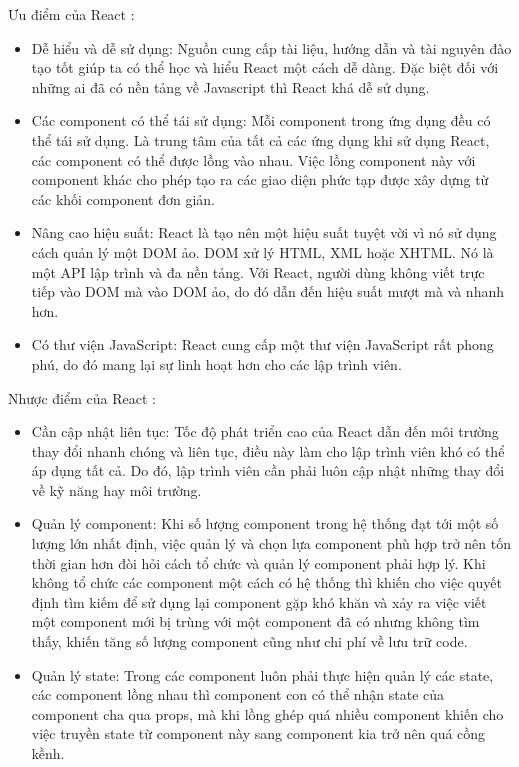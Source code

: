     Ưu điểm của React \cite{technologyReactAdvance}:
    \begin{itemize}
        \item Dễ hiểu và dễ sử dụng: Nguồn cung cấp tài liệu, hướng dẫn và tài nguyên đào tạo tốt giúp ta có thể học và hiểu React một cách dễ dàng. Đặc biệt đối với những ai đã có nền tảng về Javascript thì React khá dễ sử dụng.
        \item Các component có thể tái sử dụng: Mỗi component trong ứng dụng đều có thể tái sử dụng. Là trung tâm của tất cả các ứng dụng khi sử dụng React, các component có thể được lồng vào nhau. Việc lồng component này với component khác cho phép tạo ra các giao diện phức tạp được xây dựng từ các khối component đơn giản.
        \item Nâng cao hiệu suất: React là tạo nên một hiệu suất tuyệt vời vì nó sử dụng cách quản lý một DOM ảo. DOM xử lý HTML, XML hoặc XHTML. Nó là một API lập trình và đa nền tảng. Với React, người dùng không viết trực tiếp vào DOM mà vào DOM ảo, do đó dẫn đến hiệu suất mượt mà và nhanh hơn.
        \item Có thư viện JavaScript: React cung cấp một thư viện JavaScript rất phong phú, do đó mang lại sự linh hoạt hơn cho các lập trình viên.
    \end{itemize}

    Nhược điểm của React \cite{technologyReactAdvance}:
    \begin{itemize}
        \item Cần cập nhật liên tục: Tốc độ phát triển cao của React dẫn đến môi trường thay đổi nhanh chóng và liên tục, điều này làm cho lập trình viên khó có thể áp dụng tất cả. Do đó, lập trình viên cần phải luôn cập nhật những thay đổi về kỹ năng hay môi trường.
        \item Quản lý component: Khi số lượng component trong hệ thống đạt tới một số lượng lớn nhất định, việc quản lý và chọn lựa component phù hợp trở nên tốn thời gian hơn đòi hỏi cách tổ chức và quản lý component phải hợp lý. Khi không tổ chức các component một cách có hệ thống thì khiến cho việc quyết định tìm kiếm để sử dụng lại component gặp khó khăn và xảy ra việc viết một component mới bị trùng với một component đã có nhưng không tìm thấy, khiến tăng số lượng component cũng như chi phí về lưu trữ code.
        \item Quản lý state: Trong các component luôn phải thực hiện quản lý các state, các component lồng nhau thì component con có thể nhận state của component cha qua props, mà khi lồng ghép quá nhiều component khiến cho việc truyền state từ component này sang component kia trở nên quá cồng kềnh.
    \end{itemize}
